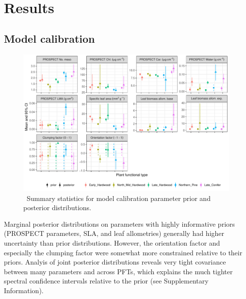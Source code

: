 \section{Results}

\subsection{Model calibration}

\begin{figure}
  \centering
  \includegraphics[width=\textwidth]{figures/pda_summary.pdf}
  \caption{\
    Summary statistics for model calibration parameter prior and posterior distributions.
  }\label{fig:pda_posteriors}
\end{figure}

Marginal posterior distributions on parameters with highly informative priors (PROSPECT parameters, SLA, and leaf allometries) generally had higher uncertainty than prior distributions.
However, the orientation factor and especially the clumping factor were somewhat more constrained relative to their priors.
Analyis of joint posterior distributions reveals very tight covariance between many parameters and across PFTs, which explains the much tighter spectral confidence intervals relative to the prior (see Supplementary Information).

